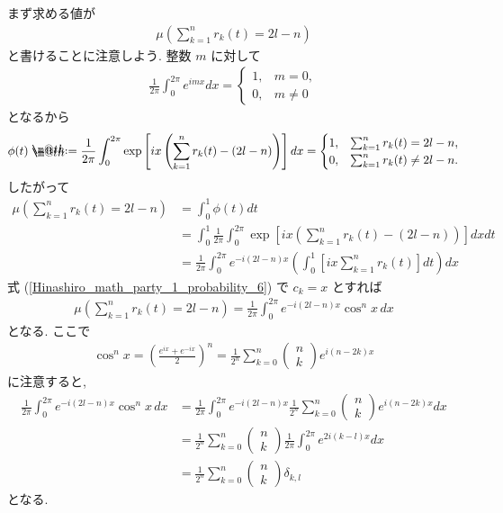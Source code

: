 \documentclass[openany, a4paper, oneside]{book}
\makeatletter
\newcommand*{\defeq}{\mathrel{\rlap{%
\raisebox{0.3ex}{$\m@th\cdot$}}%
\raisebox{-0.3ex}{$\m@th\cdot$}}%
=}
\theoremstyle{break}
\theoremstyle{breakdefn}
\newcommand{\rbk}[1]{\left (#1\right)}
\newcommand{\sqbk}[1]{\left[#1\right]}
\makeatother
\begin{document}
まず求める値が
\begin{align}
 \mu \rbk{\sum_{k=1}^{n} r_k (t) = 2l - n}
\end{align}
と書けることに注意しよう.
整数 $m$ に対して
\begin{align}
 \frac{1}{2 \pi} \int_0^{2 \pi} e^{imx} dx
 =
 \begin{cases}
  1, & m=0, \\
  0, & m \neq 0
 \end{cases}
\end{align}
となるから
\begin{align}
 \phi (t)
 \defeq
 \frac{1}{2 \pi} \int_0^{2 \pi} \exp \sqbk{ix \rbk{\sum_{k=1}^{n} r_k (t) - \rbk{2l-n}}} dx
 =
 \begin{cases}
  1, &  \sum_{k=1}^{n} r_k (t) = 2l - n, \\
  0, &  \sum_{k=1}^{n} r_k (t) \neq 2l - n.
 \end{cases}
\end{align}
したがって
\begin{align}
 \mu \rbk{\sum_{k=1}^n r_k (t) = 2 l - n}
 &=
 \int_0^1 \phi (t) dt \\
 &=
 \int_0^1 \frac{1}{2 \pi} \int_0^{2 \pi} \exp \sqbk{ix \rbk{\sum_{k=1}^{n} r_k (t) - \rbk{2l-n}}} dx dt \\
 &=
 \frac{1}{2 \pi} \int_0^{2 \pi} e^{-i (2l -n) x} \rbk{\int_0^1 \sqbk{ix \sum_{k=1}^{n} r_k (t)} dt} dx
\end{align}
式 (\ref{Hinashiro_math_party_1_probability_6}) で $c_k = x$ とすれば
\begin{align}
 \mu \rbk{\sum_{k=1}^n r_k (t) = 2 l - n}
 =
 \frac{1}{2 \pi} \int_0^{2 \pi} e^{-i (2l -n) x} \cos^n x \, dx
\end{align}
となる.
ここで
\begin{align}
 \cos^n x
 =
 \rbk{\frac{e^{ix} + e^{-ix}}{2}}^n
 =
 \frac{1}{2^n} \sum_{k=0}^n
 \begin{pmatrix}
  n \\
  k
 \end{pmatrix}
 e^{i (n - 2k) x}
\end{align}
に注意すると,
\begin{align}
 \frac{1}{2 \pi} \int_0^{2 \pi} e^{-i (2l -n) x} \cos^n x \, dx
 &=
 \frac{1}{2 \pi} \int_0^{2 \pi} e^{-i (2l -n) x}
  \frac{1}{2^n} \sum_{k=0}^n
  \begin{pmatrix}
   n \\
   k
  \end{pmatrix}
  e^{i (n - 2k) x} dx \\
 &=
 \frac{1}{2^n} \sum_{k=0}^n
  \begin{pmatrix}
   n \\
   k
  \end{pmatrix}
  \frac{1}{2 \pi}
  \int_0^{2 \pi} e^{2 i (k - l) x} dx \\
 &=
 \frac{1}{2^n} \sum_{k=0}^n
  \begin{pmatrix}
   n \\
   k
  \end{pmatrix}
  \delta_{k,l}
\end{align}
となる.
\end{document}
